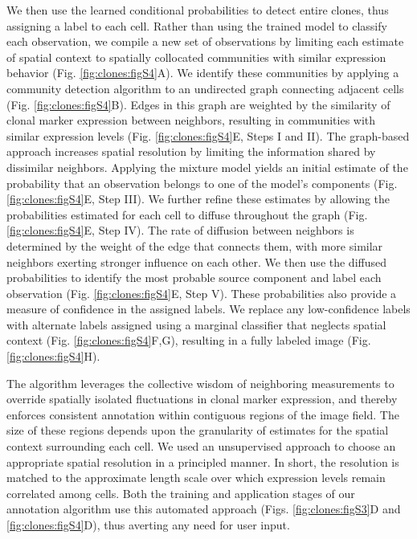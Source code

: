 We then use the learned conditional probabilities to detect entire clones, thus assigning a label to each cell. Rather than using the trained model to classify each observation, we compile a new set of observations by limiting each estimate of spatial context to spatially collocated communities with similar expression behavior (Fig. \ref{fig:clones:figS4}A). We identify these communities by applying a community detection algorithm to an undirected graph connecting adjacent cells (Fig. \ref{fig:clones:figS4}B). Edges in this graph are weighted by the similarity of clonal marker expression between neighbors, resulting in communities with similar expression levels (Fig. \ref{fig:clones:figS4}E, Steps I and II). The graph-based approach increases spatial resolution by limiting the information shared by dissimilar neighbors. Applying the mixture model yields an initial estimate of the probability that an observation belongs to one of the model's components (Fig. \ref{fig:clones:figS4}E, Step III). We further refine these estimates by allowing the probabilities estimated for each cell to diffuse throughout the graph (Fig. \ref{fig:clones:figS4}E, Step IV). The rate of diffusion between neighbors is determined by the weight of the edge that connects them, with more similar neighbors exerting stronger influence on each other. We then use the diffused probabilities to identify the most probable source component and label each observation (Fig. \ref{fig:clones:figS4}E, Step V). These probabilities also provide a measure of confidence in the assigned labels. We replace any low-confidence labels with alternate labels assigned using a marginal classifier that neglects spatial context (Fig. \ref{fig:clones:figS4}F,G), resulting in a fully labeled image (Fig. \ref{fig:clones:figS4}H).

The algorithm leverages the collective wisdom of neighboring measurements to override spatially isolated fluctuations in clonal marker expression, and thereby enforces consistent annotation within contiguous regions of the image field. The size of these regions depends upon the granularity of estimates for the spatial context surrounding each cell. We used an unsupervised approach to choose an appropriate spatial resolution in a principled manner. In short, the resolution is matched to the approximate length scale over which expression levels remain correlated among cells. Both the training and application stages of our annotation algorithm use this automated approach (Figs. \ref{fig:clones:figS3}D and \ref{fig:clones:figS4}D), thus averting any need for user input.

